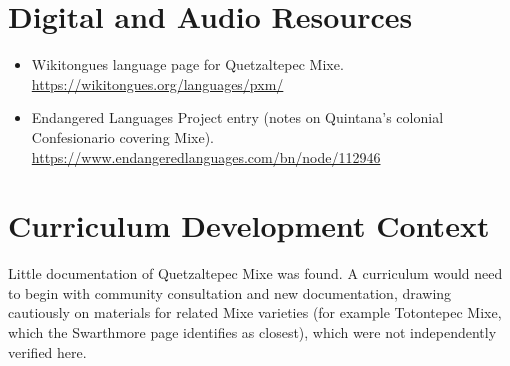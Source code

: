 \documentclass[12pt]{article}
\begin{document}
\section{Digital and Audio Resources}
\begin{itemize}
\item Wikitongues language page for Quetzaltepec Mixe. \url{https://wikitongues.org/languages/pxm/}
\item Endangered Languages Project entry (notes on Quintana's colonial Confesionario covering Mixe). \url{https://www.endangeredlanguages.com/bn/node/112946}
\end{itemize}

\section{Curriculum Development Context}
Little documentation of Quetzaltepec Mixe was found. A curriculum would need to begin with community consultation and new documentation, drawing cautiously on materials for related Mixe varieties (for example Totontepec Mixe, which the Swarthmore page identifies as closest), which were not independently verified here.
\end{document}
